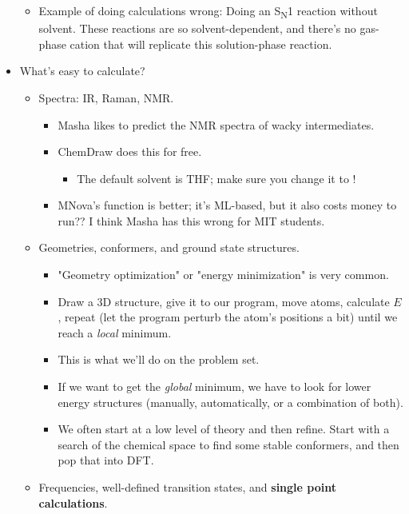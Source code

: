 \documentclass[../notes.tex]{subfiles}
\begin{document}
\begin{itemize}
\begin{itemize}
\begin{itemize}
        \end{itemize}
        \item Example of doing calculations wrong: Doing an S\textsubscript{N}1 reaction without solvent. These reactions are so solvent-dependent, and there's no gas-phase cation that will replicate this solution-phase reaction.
    \end{itemize}
    \item What's easy to calculate?
    \begin{itemize}
        \item Spectra: IR, Raman, NMR.
        \begin{itemize}
            \item Masha likes to predict the NMR spectra of wacky intermediates.
            \item ChemDraw does this for free.
            \begin{itemize}
                \item The default solvent is THF; make sure you change it to !
            \end{itemize}
            \item MNova's function is better; it's ML-based, but it also costs money to run?? I think Masha has this wrong for MIT students.
        \end{itemize}
        \item Geometries, conformers, and ground state structures.
        \begin{itemize}
            \item "Geometry optimization" or "energy minimization" is very common.
            \item Draw a 3D structure, give it to our program, move atoms, calculate $E$, repeat (let the program perturb the atom's positions a bit) until we reach a \emph{local} minimum.
            \item This is what we'll do on the problem set.
            \item If we want to get the \emph{global} minimum, we have to look for lower energy structures (manually, automatically, or a combination of both).
            \item We often start at a low level of theory and then refine. Start with a search of the chemical space to find some stable conformers, and then pop that into DFT.
        \end{itemize}
        \item Frequencies, well-defined transition states, and \textbf{single point calculations}.

\end{itemize}
\end{itemize}
\end{document}
